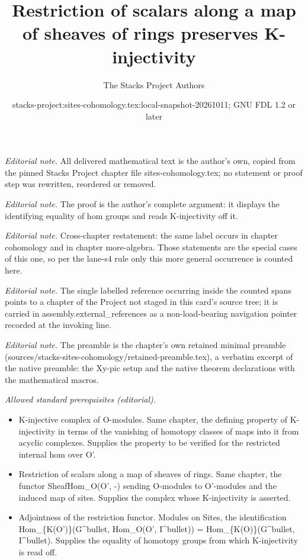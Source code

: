 \documentclass[10pt,a4paper]{amsart}
\title{Restriction of scalars along a map of sheaves of rings preserves K-injectivity}
\author{The Stacks Project Authors}
\date{stacks-project:sites-cohomology.tex:local-snapshot-20261011; GNU FDL 1.2 or later}
\theoremstyle{plain}
\theoremstyle{definition}
\theoremstyle{remark}
\numberwithin{equation}{subsection}
\begin{document}
\maketitle
\noindent\textit{Editorial note.} All delivered mathematical text is the author's own, copied from the pinned Stacks Project chapter file sites-cohomology.tex; no statement or proof step was rewritten, reordered or removed.\par\medskip
\noindent\textit{Editorial note.} The proof is the author's complete argument: it displays the identifying equality of hom groups and reads K-injectivity off it.\par\medskip
\noindent\textit{Editorial note.} Cross-chapter restatement: the same label occurs in chapter cohomology and in chapter more-algebra. Those statements are the special cases of this one, so per the lane-s4 rule only this more general occurrence is counted here.\par\medskip
\noindent\textit{Editorial note.} The single labelled reference occurring inside the counted spans points to a chapter of the Project not staged in this card's source tree; it is carried in assembly.external\_references as a non-load-bearing navigation pointer recorded at the invoking line.\par\medskip
\noindent\textit{Editorial note.} The preamble is the chapter's own retained minimal preamble (sources/stacks-sites-cohomology/retained-preamble.tex), a verbatim excerpt of the native preamble: the Xy-pic setup and the native theorem declarations with the mathematical macros.\par\medskip
\noindent\textit{Allowed standard prerequisites (editorial).}\begin{itemize}
\item K-injective complex of O-modules. Same chapter, the defining property of K-injectivity in terms of the vanishing of homotopy classes of maps into it from acyclic complexes. Supplies the property to be verified for the restricted internal hom over O'.
\item Restriction of scalars along a map of sheaves of rings. Same chapter, the functor SheafHom\_O(O', -) sending O-modules to O'-modules and the induced map of sites. Supplies the complex whose K-injectivity is asserted.
\item Adjointness of the restriction functor. Modules on Sites, the identification Hom\_\{K(O')\}(G\textasciicircum{}bullet, Hom\_O(O', I\textasciicircum{}bullet)) = Hom\_\{K(O)\}(G\textasciicircum{}bullet, I\textasciicircum{}bullet). Supplies the equality of homotopy groups from which K-injectivity is read off.
\end{itemize}\medskip
\end{document}
